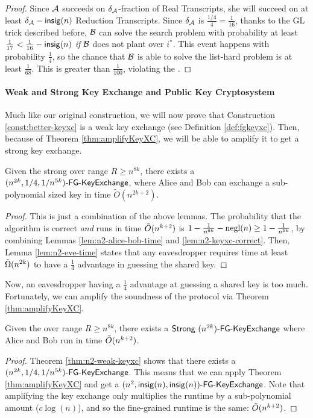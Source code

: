 \begin{proof}
	Since $\cA$ succeeds on $\delta_{\cA}$-fraction of Real Transcripts, she will succeed on at least $\delta_{\cA} - \insig(n)$ Reduction Transcripts. Since $\delta_{\cA}$ is $\frac{1/4}{4} = \frac{1}{16}$, thanks to the GL trick described before, $\cB$ can solve the search problem with probability at least $\frac{1}{17} < \frac{1}{16} - \insig(n)$ \emph{if} $\cB$ does not plant over $i^*$. This event happens with probability $\frac{1}{4}$, so the chance that $\cB$ is able to solve the list-hard problem is at least $\frac{1}{68}$.
	This is greater than $\frac{1}{100}$, violating the \strongzkc.
\end{proof}

\paragraph{Weak and Strong Key Exchange and Public Key Cryptosystem}
Much like our original construction, we will now prove that Construction \ref{const:better-keyxc} is a weak key exchange (see Definition \ref{def:fgkeyxc}). Then, because of Theorem \ref{thm:amplifyKeyXC}, we will be able to amplify it to get a strong key exchange.

\begin{theorem}\label{thm:n2-weak-keyxc}
	Given the strong \zkclique over range $R \ge n^{8k}$, there exists a
	$\fgkeyxc{n^{2k}}{1/4}{1/n^{5k}}$, where Alice and Bob can exchange a sub-poly\-nomial sized key in time $\tilde{O}\left(n^{2k + 2}\right)$.
\end{theorem}
\begin{proof}
	This is just a combination of the above lemmas. The probability that the algorithm is correct \emph{and} runs in time $\~O(n^{k+2})$ is $1 - \frac{1}{n^{6k}} - \negl(n) \ge 1 - \frac{1}{n^{5k}}$, by combining Lemmas \ref{lem:n2-alice-bob-time} and \ref{lem:n2-keyxc-correct}. Then, Lemma \ref{lem:n2-eve-time} states that any eavesdropper requires time at least $\~\Omega(n^{2k})$ to have a $\frac 1 4$ advantage in guessing the shared key.
\end{proof}

Now, an eavesdropper having a $\frac 1 4$ advantage at guessing a shared key is too much. Fortunately, we can amplify the soundness of the protocol via Theorem \ref{thm:amplifyKeyXC}.

\begin{corollary}
	Given the \strongzkc over range $R \ge n^{8k}$, there exists a
	$\strongfgkeyxc{n^{2k}}$ where Alice and Bob run in time $\~O(n^{k+2})$.
\end{corollary}
\begin{proof}
	Theorem \ref{thm:n2-weak-keyxc} shows that there exists a $\fgkeyxc{n^{2k}}{1/4}{1/n^{5k}}$. This means that we can apply Theorem \ref{thm:amplifyKeyXC} and get a $\fgkeyxc{n^2}{\insig(n)}{\insig(n)}$. Note that amplifying the key exchange only multiplies the runtime by a sub-poly\-nomial amount ($c\log(n)$), and so the fine-grained runtime is the same: $\~O(n^{k+2})$.
\end{proof}

